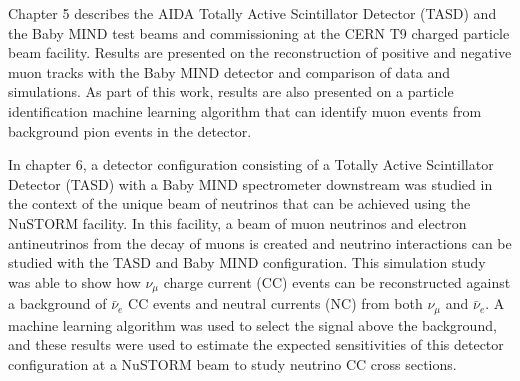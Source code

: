 
Chapter 5 describes the AIDA Totally Active Scintillator Detector (TASD) and the Baby MIND test beams and commissioning at the CERN T9 charged particle beam facility. Results are presented on the reconstruction of positive and negative muon tracks with the Baby MIND detector and comparison of data and simulations. As part of this work, results are also presented on a particle identification machine learning algorithm that can identify muon events from background pion events in the detector.


In chapter 6, a detector configuration consisting of a Totally Active Scintillator Detector (TASD) with a Baby MIND spectrometer downstream was studied in the context of the unique beam of neutrinos that can be achieved using the NuSTORM facility. In this facility, a beam of muon neutrinos and electron antineutrinos from the decay of muons is created and neutrino interactions can be studied with the TASD and Baby MIND configuration. This simulation study was able to show how $\nu_\mu$ charge current (CC) events can be reconstructed against a background of $\bar{\nu}_e$ CC events and neutral currents (NC) from both $\nu_\mu$ and $\bar{\nu}_e$. A machine learning algorithm was used to select the signal above the background, and these results were used to estimate the expected sensitivities of this detector configuration at a NuSTORM beam to study neutrino CC cross sections.


